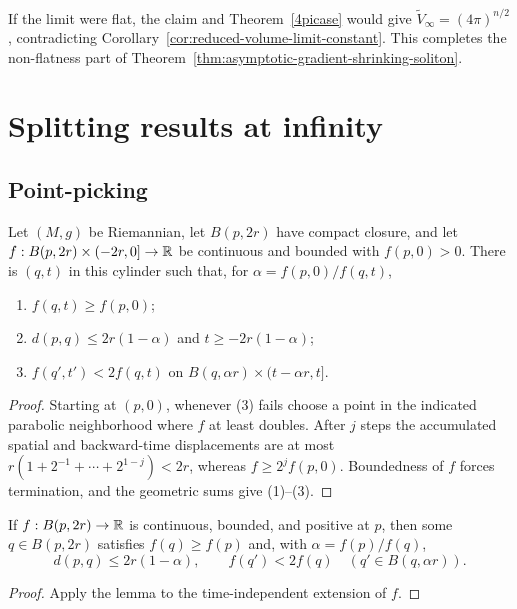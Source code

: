 If the limit were flat, the claim and Theorem~\ref{4picase} would
give $\widetilde V_\infty=(4\pi)^{n/2}$, contradicting
Corollary~\ref{cor:reduced-volume-limit-constant}. This completes the
non-flatness part of Theorem~\ref{thm:asymptotic-gradient-shrinking-soliton}.

\section{Splitting results at infinity}

\subsection{Point-picking}

\begin{lemma}\label{lem:point-picking-general}
\label{4times}
Let $(M,g)$ be Riemannian, let $B(p,2r)$ have compact closure, and
let $f:B(p,2r)\times(-2r,0]\to\mathbb{R}$ be continuous and bounded with
$f(p,0)>0$. There is $(q,t)$ in this cylinder such that, for
$\alpha=f(p,0)/f(q,t)$,
\begin{enumerate}
\item[(1)] $f(q,t)\geq f(p,0)$;
\item[(2)] $d(p,q)\leq2r(1-\alpha)$ and
$t\geq-2r(1-\alpha)$;
\item[(3)] $f(q',t')<2f(q,t)$ on
$B(q,\alpha r)\times(t-\alpha r,t]$.
\end{enumerate}
\end{lemma}
\begin{proof}
\sketch Starting at $(p,0)$, whenever (3) fails choose a point in
the indicated parabolic neighborhood where $f$ at least doubles.
After $j$ steps the accumulated spatial and backward-time
displacements are at most
$r(1+2^{-1}+\cdots+2^{1-j})<2r$, whereas $f\geq2^jf(p,0)$.
Boundedness of $f$ forces termination, and the geometric sums give
(1)--(3).
\end{proof}

\begin{corollary}\label{cor:point-picking-time-independent}
\label{pp}

If $f:B(p,2r)\to\mathbb{R}$ is continuous, bounded, and positive at $p$,
then some $q\in B(p,2r)$ satisfies $f(q)\geq f(p)$ and, with
$\alpha=f(p)/f(q)$,
\[
 d(p,q)\leq2r(1-\alpha),\qquad
 f(q')<2f(q)\quad(q'\in B(q,\alpha r)).
\]
\end{corollary}
\begin{proof}
\sketch
{}
Apply the lemma to the time-independent extension of $f$.
\end{proof}

